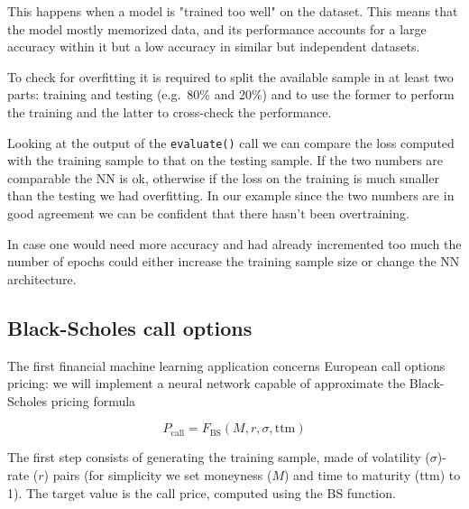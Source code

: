 This happens when a model is "trained too well" on the dataset. This means that the model mostly memorized data, and its performance accounts for a large accuracy within it but a low accuracy in similar but independent datasets. 

To check for overfitting it is required to split the available sample in at least two parts: training and testing (e.g.~80\% and 20\%) and to use the former to perform the training and the latter to cross-check the performance.


Looking at the output of the \texttt{evaluate()} call we can compare the loss computed with the training sample to that on the testing sample. If the two numbers are comparable the NN is ok, otherwise if the loss on the training is much smaller than the testing we had overfitting.
In our example since the two numbers are in good agreement we can be confident that there hasn't been overtraining.

In case one would need more accuracy and had already incremented too much the number of epochs could either increase the training sample size or change the NN architecture.

\subsection{Black-Scholes call options}
\label{black-scholes-call-options}

The first financial machine learning application concerns European call options pricing: we will implement a neural network capable of approximate the Black-Scholes pricing formula

\begin{equation} 
P_\textrm{call} = F_\textrm{BS}(M, r, \sigma, \mathrm{ttm})
\end{equation}

The first step consists of generating the training sample, made of volatility ($\sigma$)-rate ($r$) pairs (for simplicity we set moneyness ($M$) and time to maturity (ttm) to 1). The target value is the call price, computed using the BS function.

